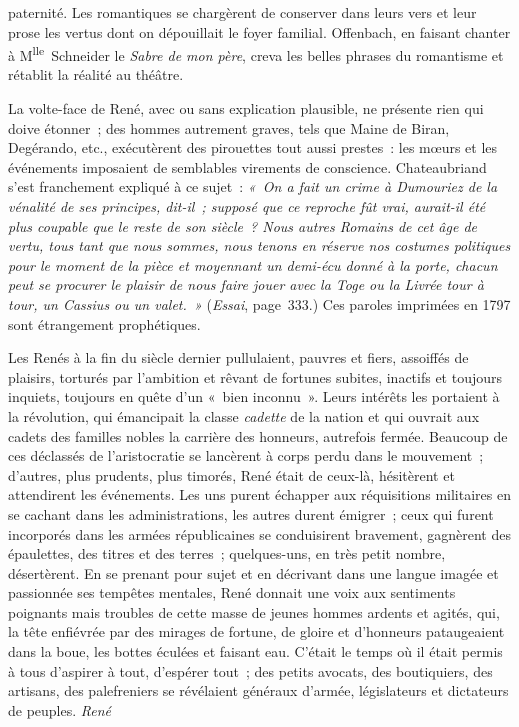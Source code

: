 \documentclass[french,twoside]{book} %
\begin{document}
\label{p584}paternité. Les romantiques se chargèrent de conserver dans leurs vers et leur prose les vertus dont on dépouillait le foyer familial. Offenbach, en faisant chanter à M\textsuperscript{lle} Schneider le \emph{Sabre de mon père}, creva les belles phrases du romantisme et rétablit la réalité au théâtre.\par
La volte-face de René, avec ou sans explication plausible, ne présente rien qui doive étonner ; des hommes autrement graves, tels que Maine de Biran, Degérando, etc., exécutèrent des pirouettes tout aussi prestes : les mœurs et les événements imposaient de semblables virements de conscience. Chateaubriand s’est franchement expliqué à ce sujet : \emph{« On a fait un crime à Dumouriez de la vénalité de ses principes, dit-il ; supposé que ce reproche fût vrai, aurait-il été plus coupable que le reste de son siècle ? Nous autres Romains de cet âge de vertu, tous tant que nous sommes, nous tenons en réserve nos costumes politiques pour le moment de la pièce et moyennant un demi-écu donné à la porte, chacun peut se procurer le plaisir de nous faire jouer avec la Toge ou la Livrée tour à tour, un Cassius ou un valet. »} (\emph{Essai}, page 333.) Ces paroles imprimées en 1797 sont étrangement prophétiques.\par
Les Renés à la fin du siècle dernier pullulaient, pauvres et fiers, assoiffés de plaisirs, torturés par l’ambition et rêvant de fortunes subites, inactifs et toujours inquiets, toujours en quête d’un « bien inconnu ». Leurs intérêts les portaient à la révolution, qui émancipait la classe {\itshape cadette} de la nation et qui ouvrait aux cadets des familles nobles la carrière des honneurs, autrefois fermée. Beaucoup de ces déclassés de l’aristocratie se lancèrent à corps perdu dans le mouvement ; d’autres, plus prudents, plus timorés, René était de ceux-là, hésitèrent et attendirent les événements. Les uns purent échapper aux réquisitions militaires en se cachant dans les administrations, les autres durent émigrer ; ceux qui furent incorporés dans les armées républicaines se conduisirent bravement, gagnèrent des épaulettes, des titres et des terres ; quelques-uns, en très petit nombre, désertèrent. En se prenant pour sujet et en décrivant dans une langue imagée et passionnée ses tempêtes mentales, René donnait une voix aux sentiments poignants mais troubles de cette masse de jeunes hommes ardents et agités, qui, la tête enfiévrée par des mirages de fortune, de gloire et d’honneurs pataugeaient dans la boue, les bottes éculées et faisant eau. C’était le temps où il était permis à tous d’aspirer à tout, d’espérer tout ; des petits avocats, des boutiquiers, des artisans, des palefreniers se révélaient généraux d’armée, législateurs et dictateurs de peuples. \emph{René}  
\end{document}
